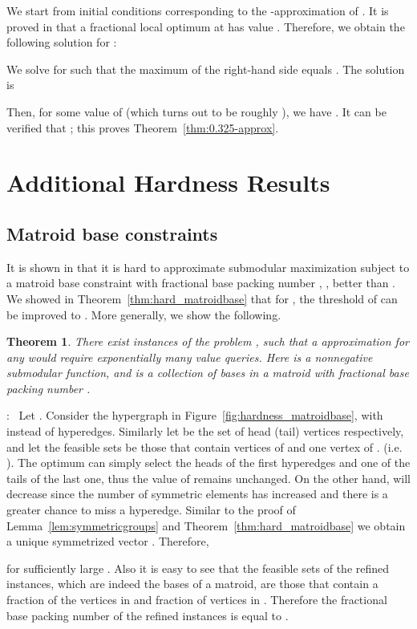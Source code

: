 \documentclass{article}[11pt]
\newtheorem{theorem}{Theorem}[section]
\renewenvironment{proof}{\noindent{\bf Proof}:~}{\\}
\begin{document}
We start from initial conditions corresponding to the -approximation
of \cite{Vondrak09}. It is proved in \cite{Vondrak09} that a fractional local optimum
at  has value .
Therefore, we obtain the following solution for :

We solve for  such that the maximum of the right-hand side equals .
The solution is 

Then, for some value of  (which turns out to be roughly ),
we have . It can be verified that ;
this proves Theorem~\ref{thm:0.325-approx}.






\section{Additional Hardness Results}
\label{app:hardness}

\subsection{Matroid base constraints}

It is shown in \cite{Vondrak09} that it is hard to approximate submodular maximization
subject to a matroid base constraint with fractional base packing number ,
, better than .
We showed in Theorem~\ref{thm:hard_matroidbase} that for ,
the threshold of  can be improved to .
More generally, we show the following. 

\begin{theorem}
There exist instances of the problem ,
such that a  approximation for any  
would require exponentially many value queries.
Here  is a nonnegative submodular function,
and  is a collection of bases in a matroid with fractional base packing
number . 
\end{theorem}

\begin{proof}
Let .
Consider the hypergraph  in Figure~\ref{fig:hardness_matroidbase},
with  instead of  hyperedges. Similarly let   be the set of head (tail) vertices
respectively, and let the feasible sets be those that contain  vertices of  and
one vertex of . (i.e. ).
The optimum can simply select the heads of the first  hyperedges
and one of the tails of the last one, thus the value of  remains unchanged.
On the other hand,  will decrease since the number of symmetric elements
has increased and there is a greater chance to miss a hyperedge.
Similar to the proof of Lemma~\ref{lem:symmetricgroups} and
Theorem~\ref{thm:hard_matroidbase} we obtain a unique symmetrized
vector . Therefore,

for sufficiently large . Also it is easy to see that the feasible sets
of the refined instances, which are indeed the bases of a matroid,
are those that contain a  fraction of the vertices in 
and  fraction of vertices in . Therefore the fractional base packing number
of the refined instances is equal to .
\end{proof}
\end{document}
